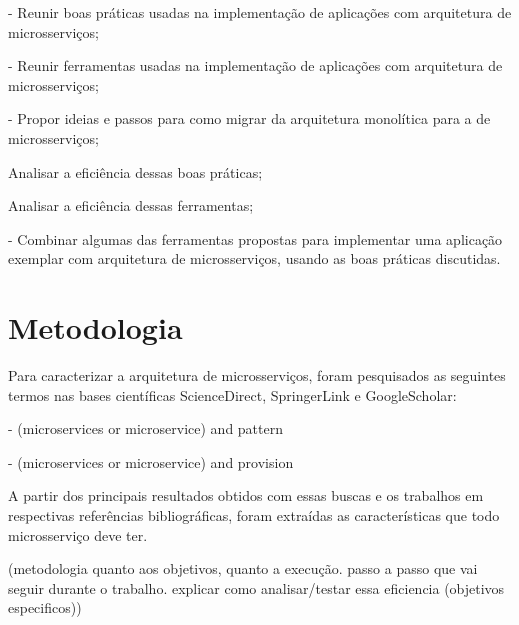 - Reunir boas práticas usadas na implementação de aplicações com arquitetura de microsserviços;

- Reunir ferramentas usadas na implementação de aplicações com arquitetura de microsserviços;

- Propor ideias e passos para como migrar da arquitetura monolítica para a de microsserviços;

Analisar a eficiência dessas boas práticas;

Analisar a eficiência dessas ferramentas;

- Combinar algumas das ferramentas propostas para implementar uma aplicação exemplar com arquitetura de microsserviços, usando as boas práticas discutidas.

\section{Metodologia}

Para caracterizar a arquitetura de microsserviços, foram pesquisados as seguintes termos nas bases científicas ScienceDirect, SpringerLink e GoogleScholar:

- (microservices or microservice) and pattern

- (microservices or microservice) and provision

A partir dos principais resultados obtidos com essas buscas e os trabalhos em respectivas referências bibliográficas, foram extraídas as características que todo microsserviço deve ter.

(metodologia quanto aos objetivos, quanto a execução. passo a passo que vai seguir durante o trabalho. explicar como analisar/testar essa eficiencia (objetivos especificos))